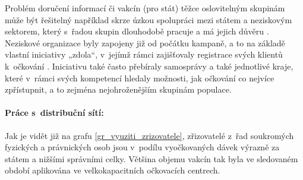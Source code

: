 Problém doručení informací či vakcín (pro stát) těžce oslovitelným skupinám může být řešitelný například skrze úzkou spolupráci mezi státem a neziskovým sektorem, který s~řadou skupin dlouhodobě pracuje a má jejich důvěru \cite{logoc_bilamista}. Neziskové organizace byly zapojeny již od počátku kampaně, a to na základě vlastní iniciativy „zdola“, v~jejímž rámci zajišťovaly registrace svých klientů k~očkování \cite{logoc_bilamista}. Iniciativu také často přebíraly samosprávy a také jednotlivé kraje, které v~rámci svých kompetencí hledaly možnosti, jak očkování co nejvíce zpřístupnit, a to zejména nejohroženějším skupinám populace. 




\paragraph{Práce s~distribuční sítí:} Jak je vidět již na grafu \ref{gr_vyuziti_zrizovatele}, zřizovatelé z~řad soukromých fyzických a právnických osob jsou v~podílu vyočkovaných dávek výrazně za státem a nižšími správními celky. Většina objemu vakcín tak byla ve sledovaném období aplikována ve velkokapacitních očkovacích centrech.%




